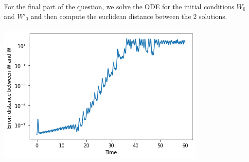 \documentclass{article}
\begin{document}
\newpage
\noindent
For the final part of the question, we solve the ODE for the initial conditions $W_0$ and $W'_0$ and then compute the euclidean distance between the 2 solutions. 
\\\\
\includegraphics[width=\textwidth]{error.png}
\end{document}
